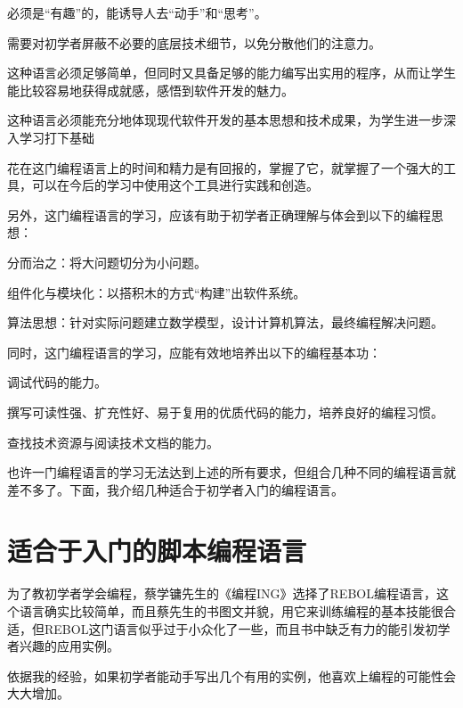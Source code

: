 \begin{compactenum}
\item 必须是“有趣”的，能诱导人去“动手”和“思考”。
\item 需要对初学者屏蔽不必要的底层技术细节，以免分散他们的注意力。
\item 这种语言必须足够简单，但同时又具备足够的能力编写出实用的程序，从而让学生能比较容易地获得成就感，感悟到软件开发的魅力。
\item 这种语言必须能充分地体现现代软件开发的基本思想和技术成果，为学生进一步深入学习打下基础
\item 花在这门编程语言上的时间和精力是有回报的，掌握了它，就掌握了一个强大的工具，可以在今后的学习中使用这个工具进行实践和创造。
\end{compactenum}

另外，这门编程语言的学习，应该有助于初学者正确理解与体会到以下的编程思想：

\begin{compactenum}
\item 分而治之：将大问题切分为小问题。
\item 组件化与模块化：以搭积木的方式“构建”出软件系统。
\item 算法思想：针对实际问题建立数学模型，设计计算机算法，最终编程解决问题。
\end{compactenum}

同时，这门编程语言的学习，应能有效地培养出以下的编程基本功：

\begin{compactenum}
\item 调试代码的能力。
\item 撰写可读性强、扩充性好、易于复用的优质代码的能力，培养良好的编程习惯。
\item 查找技术资源与阅读技术文档的能力。
\end{compactenum}

也许一门编程语言的学习无法达到上述的所有要求，但组合几种不同的编程语言就差不多了。下面，我介绍几种适合于初学者入门的编程语言。

\section{适合于入门的脚本编程语言}

为了教初学者学会编程，蔡学镛先生的《编程ING》选择了REBOL编程语言，这个语言确实比较简单，而且蔡先生的书图文并貌，用它来训练编程的基本技能很合适，但REBOL这门语言似乎过于小众化了一些，而且书中缺乏有力的能引发初学者兴趣的应用实例。

依据我的经验，如果初学者能动手写出几个有用的实例，他喜欢上编程的可能性会大大增加。


